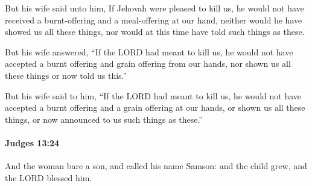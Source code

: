 			\begin{versebox}
					\item[BHS] 
					\item[ASV] But his wife said unto him, If Jehovah were pleased to kill us, he would not have received a burnt-offering and a meal-offering at our hand, neither would he have showed us all these things, nor would at this time have told such things as these.
					\item[NIV] But his wife answered, “If the LORD had meant to kill us, he would not have accepted a burnt offering and grain offering from our hands, nor shown us all these things or now told us this.”
					\item[NRSV] But his wife said to him, “If the LORD had meant to kill us, he would not have accepted a burnt offering and a grain offering at our hands, or shown us all these things, or now announced to us such things as these.”
			\end{versebox}

		\paragraph{Judges 13:24} %
			\label{JUDGES-13-24}

			And the woman bare a son, and called his name Samson: and the child grew, and the LORD blessed him.

